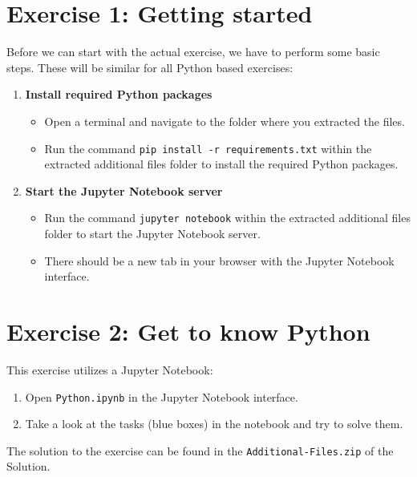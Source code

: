 \documentclass[
english,
smallborders
]{i6prcsht}
\begin{document}
\section*{Exercise 1: Getting started}

Before we can start with the actual exercise, we have to perform some basic steps. These will be similar for all Python based exercises:

\begin{enumerate}
	\item \textbf{Install required Python packages}

	      \begin{itemize}
		      \item Open a terminal and navigate to the folder where you extracted the files.
		      \item Run the command \texttt{pip install -r requirements.txt} within the extracted additional files
		            folder to install the required Python packages.
	      \end{itemize}

	\item \textbf{Start the Jupyter Notebook server}

	      \begin{itemize}
		      \item Run the command \texttt{jupyter notebook} within the extracted additional files
		            folder to start the Jupyter Notebook server.
		      \item There should be a new tab in your browser with the Jupyter Notebook interface.
	      \end{itemize}
\end{enumerate}

\section*{Exercise 2: Get to know Python}

This exercise utilizes a Jupyter Notebook:

\begin{enumerate}
	\item Open \texttt{Python.ipynb} in the Jupyter Notebook interface.
	\item Take a look at the tasks (blue boxes) in the notebook and try to solve them.
\end{enumerate}

\begin{solution}
	The solution to the exercise can be found in the \texttt{Additional-Files.zip} of the Solution.
\end{solution}
\end{document}
